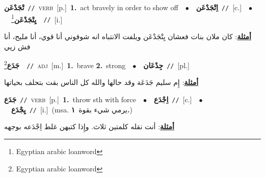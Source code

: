 \documentclass[10pt,a4paper,twoside]{article} %
\begin{document}
\begin{multicols}{2}
{\setlength\topsep{0pt}\textbf{\foreignlanguage{arabic}{تْجَدْعَن}}\ {\color{gray}\texttt{//}\color{black}}\ \textsc{verb}\ [p.]\ \textbf{1.}~act bravely in order to show off\ \ $\bullet$\ \ \setlength\topsep{0pt}\textbf{\foreignlanguage{arabic}{اِتْجَدْعَن}}\ {\color{gray}\texttt{//}\color{black}}\ [c.]\ \ $\bullet$\ \ \setlength\topsep{0pt}\textbf{\foreignlanguage{arabic}{يِتْجَدْعَن}}\footnote{Egyptian arabic loanword}\ \ {\color{gray}\texttt{//}\color{black}}\ [i.]\  \begin{flushright}\color{gray}\foreignlanguage{arabic}{\textbf{\underline{\foreignlanguage{arabic}{أمثلة}}}: كان ملان بنات فعشان يِتْجَدْعَن ويلفت الانتباه انه شوفوني أنا قوي، أنا مليح، أنا فش زيي}\end{flushright}\color{black}} \vspace{2mm}

{\setlength\topsep{0pt}\textbf{\foreignlanguage{arabic}{جَدَع}}\footnote{Egyptian arabic loanword}\ \ {\color{gray}\texttt{//}\color{black}}\ \textsc{adj}\ [m.]\ \textbf{1.}~brave  \textbf{2.}~strong\ \ $\bullet$\ \ \setlength\topsep{0pt}\textbf{\foreignlanguage{arabic}{جِدْعَان}}\ {\color{gray}\texttt{//}\color{black}}\ [pl.]\  \begin{flushright}\color{gray}\foreignlanguage{arabic}{\textbf{\underline{\foreignlanguage{arabic}{أمثلة}}}: إِم سليم جَدَعَة وقد حالها والله كل الناس بقت بتحلف بحياتها}\end{flushright}\color{black}} \vspace{2mm}

{\setlength\topsep{0pt}\textbf{\foreignlanguage{arabic}{جَدَع}}\ {\color{gray}\texttt{//}\color{black}}\ \textsc{verb}\ [p.]\ \textbf{1.}~throw sth with force\ \ $\bullet$\ \ \setlength\topsep{0pt}\textbf{\foreignlanguage{arabic}{اِجْدَع}}\ {\color{gray}\texttt{//}\color{black}}\ [c.]\ \ $\bullet$\ \ \setlength\topsep{0pt}\textbf{\foreignlanguage{arabic}{يِجْدَع}}\ {\color{gray}\texttt{//}\color{black}}\ [i.]\ \color{gray}(msa. \foreignlanguage{arabic}{يرمي شيء بقوة}~\foreignlanguage{arabic}{\textbf{١.}})\color{black}\  \begin{flushright}\color{gray}\foreignlanguage{arabic}{\textbf{\underline{\foreignlanguage{arabic}{أمثلة}}}: أنت نقله كلمتين ثلاث. وإِذا كتبهن غلط اِجْدَعه بوجهه}\end{flushright}\color{black}} \vspace{2mm}


\end{multicols}
\end{document}
